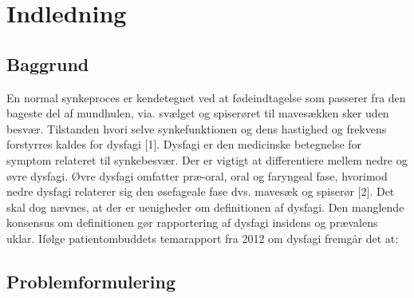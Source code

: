 \chapter{Indledning}

\section{Baggrund}
En normal synkeproces er kendetegnet ved at fødeindtagelse som passerer fra den bageste del af mundhulen, via. svælget og spiserøret til mavesækken sker uden besvær. Tilstanden hvori selve synkefunktionen og dens hastighed og frekvens forstyrres kaldes for dysfagi [1]. Dysfagi er den medicinske betegnelse for symptom relateret til synkebesvær. Der er vigtigt at differentiere mellem nedre og øvre dysfagi. Øvre dysfagi omfatter præ-oral, oral og faryngeal fase, hvorimod nedre dysfagi relaterer sig den øsefageale fase dvs. mavesæk og spiserør [2]. Det skal dog nævnes, at der er uenigheder om definitionen af dysfagi. Den manglende konsensus om definitionen gør rapportering af dysfagi insidens og prævalens uklar. Ifølge patientombuddets temarapport fra 2012 om dysfagi fremgår det at:
\section{Problemformulering}